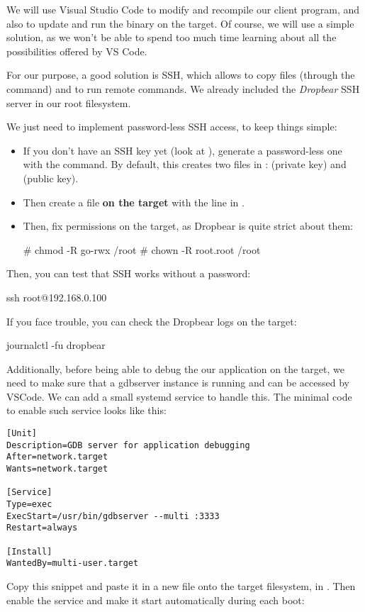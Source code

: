 We will use Visual Studio Code to modify and recompile our client
program, and also to update and run the binary on the target.
Of course, we will use a simple solution, as we won't be able to
spend too much time learning about all the possibilities offered
by VS Code.

For our purpose, a good solution is SSH, which allows to copy files
(through the  command) and to run remote commands. We already
included the {\em Dropbear} SSH server in our root filesystem.

We just need to implement password-less SSH access, to keep things
simple:

\begin{itemize}
  \item If you don't have an SSH key yet (look at ),
	generate a password-less one with the  command.
	By default, this creates two files in :
	 (private key) and  (public key).
  \item Then create a  file {\bf on the target}
        with the line in .
  \item Then, fix permissions on the target, as Dropbear is quite strict
        about them:
        \begin{bashinput}
# chmod -R go-rwx /root
# chown -R root.root /root
        \end{bashinput}
\end{itemize}

Then, you can test that SSH works without a password:

\begin{bashinput}
ssh root@192.168.0.100
\end{bashinput}

If you face trouble, you can check the Dropbear logs on the target:

\begin{bashinput}
journalctl -fu dropbear
\end{bashinput}

Additionally, before being able to debug the our application on the target, we
need to make sure that a gdbserver instance is running and can be accessed
by VSCode. We can add a small systemd service to handle this. The minimal
code to enable such service looks like this:
\begin{verbatim}
[Unit]
Description=GDB server for application debugging
After=network.target
Wants=network.target

[Service]
Type=exec
ExecStart=/usr/bin/gdbserver --multi :3333
Restart=always

[Install]
WantedBy=multi-user.target
\end{verbatim}
Copy this snippet and paste it in a new  file onto
the target filesystem, in . Then enable the
service and make it start automatically during each boot:

